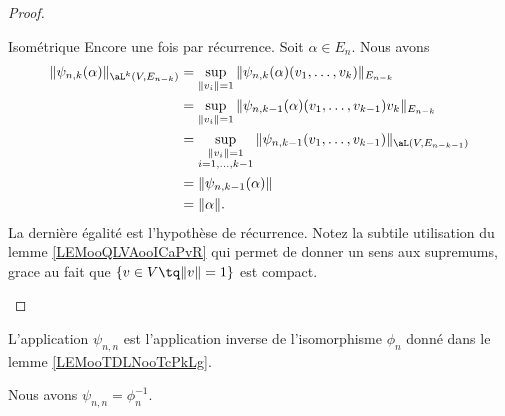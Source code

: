 \begin{proof}
\begin{subproof}
        \item[Isométrique]
            Encore une fois par récurrence. Soit \( \alpha\in E_n\). Nous avons
            \begin{subequations}
                \begin{align}
                    \| \psi_{n,k}(\alpha) \|_{\aL^k(V,E_{n-k})}&=\sup_{\| v_i \|=1}\| \psi_{n,k}(\alpha)(v_1,\ldots, v_k) \|_{E_{n-k}}\\
                    &=\sup_{\| v_i \|=1}\| \psi_{n,k-1}(\alpha)(v_1,\ldots, v_{k-1})v_k \|_{E_{n-k}}\\
                    &=\sup_{\substack{\| v_i \|=1\\i=1,\ldots, k-1}}\| \psi_{n,k-1}(v_1,\ldots, v_{k-1}) \|_{\aL(V,E_{n-k-1})}\\
                    &=\| \psi_{n,k-1}(\alpha) \|\\
                    &=\| \alpha \|.
                \end{align}
            \end{subequations}
            La dernière égalité est l'hypothèse de récurrence. Notez la subtile utilisation du lemme \ref{LEMooQLVAooICaPvR} qui permet de donner un sens aux supremums, grace au fait que \( \{ v\in V\tq \| v \|=1 \}\) est compact.
    \end{subproof}
\end{proof}

L'application \( \psi_{n,n}\) est l'application inverse de l'isomorphisme \( \phi_n\) donné dans le lemme \ref{LEMooTDLNooTcPkLg}.



\begin{lemma}       \label{LEMooFBEGooCqrzxH}
    Nous avons \( \psi_{n,n}=\phi_n^{-1}\).
\end{lemma}

